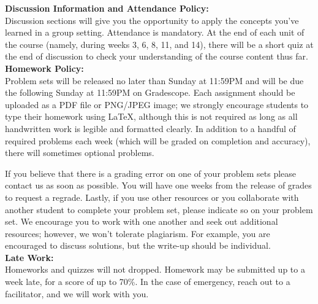 \documentclass[11pt, a4paper]{article}
\begin{document}
\noindent\textbf{Discussion Information and Attendance Policy:} \\
Discussion sections will give you the opportunity to apply the concepts you’ve learned in a group setting. Attendance is mandatory. At the end of each unit of the course (namely, during weeks 3, 6, 8, 11, and 14), there will be a short quiz at the end of discussion to check your understanding of the course content thus far.
\\

\noindent\textbf{Homework Policy:} \\
Problem sets will be released no later than Sunday at 11:59PM and will be due the following Sunday at 11:59PM on Gradescope. Each assignment should be uploaded as a PDF file or PNG/JPEG image; we strongly encourage students to type their homework using \LaTeX{}, although this is not required as long as all handwritten work is legible and formatted clearly. In addition to a handful of required problems each week (which will be graded on completion and accuracy), there will sometimes optional problems.

If you believe that there is a grading error on one of your problem sets please contact us as soon as possible. You will have one weeks from the release of grades to request a regrade. Lastly, if you use other resources or you collaborate with another student to complete your problem set, please indicate so on your problem set. We encourage you to work with one another and seek out additional resources; however, we won’t tolerate plagiarism. For example, you are encouraged to discuss solutions, but the write-up should be individual. \\

\noindent\textbf{Late Work:} \\
Homeworks and quizzes will not dropped. Homework may be submitted up to a week late, for a score of up to 70\%. In the case of emergency, reach out to a facilitator, and we will work with you. \\
\end{document}
